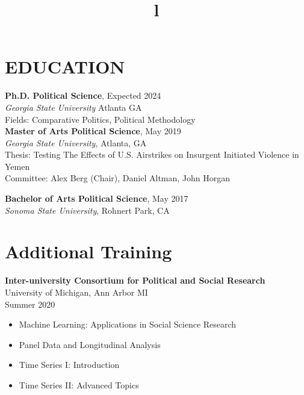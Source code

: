 \documentclass[margin]{res}
\newcommand{\fullhrulefill}{%
  \hspace*{-\sectionwidth}\hrulefill%
  }
\begin{document}
\begin{resume}


\fullhrulefill
\section{EDUCATION}
\textbf {Ph.D. Political Science}, Expected 2024 \\
{\sl Georgia State University} Atlanta GA \\
{Fields: Comparative Politics, Political Methodology} \\

\textbf{Master of Arts Political Science}, May 2019\\
{\sl Georgia State University}, Atlanta, GA\\
 Thesis: Testing The Effects of U.S. Airstrikes on Insurgent Initiated Violence in Yemen  \\
Committee: Alex Berg (Chair), Daniel Altman, John Horgan

\textbf{Bachelor of Arts Political Science}, May 2017 \\
{\sl Sonoma State University}, Rohnert Park, CA


\fullhrulefill
\section{Additional Training}
\textbf{Inter-university Consortium for Political and Social Research}\\ University of Michigan, Ann Arbor MI \\ Summer 2020
\begin{itemize}
	\item Machine Learning: Applications in Social Science Research
	\item Panel Data and Longitudinal Analysis
	\item Time Series I: Introduction
	\item Time Series II: Advanced Topics
\end{itemize}

\begin{format}
\title{l}\\
\\
\body\\
\end{format}
\fullhrulefill


\end{resume}
\end{document}
